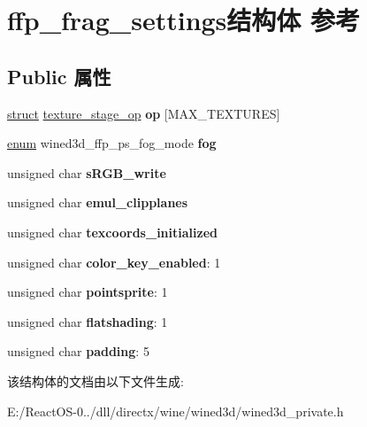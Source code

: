 \hypertarget{structffp__frag__settings}{}\section{ffp\+\_\+frag\+\_\+settings结构体 参考}
\label{structffp__frag__settings}
\subsection*{Public 属性}
\begin{DoxyCompactItemize}
\item 
\mbox{\label{structffp__frag__settings_a13650327188cc5ea8677666c7422610d}} 
\hyperlink{interfacestruct}{struct} \hyperlink{structtexture__stage__op}{texture\+\_\+stage\+\_\+op} {\bfseries op} \mbox{[}M\+A\+X\+\_\+\+T\+E\+X\+T\+U\+R\+ES\mbox{]}
\item 
\mbox{\label{structffp__frag__settings_a02babf3bd513580ca5a141f8d92f5da6}} 
\hyperlink{interfaceenum}{enum} wined3d\+\_\+ffp\+\_\+ps\+\_\+fog\+\_\+mode {\bfseries fog}
\item 
\mbox{\label{structffp__frag__settings_aff489fcd78f3488dd42478e176a00abd}} 
unsigned char {\bfseries s\+R\+G\+B\+\_\+write}
\item 
\mbox{\label{structffp__frag__settings_af1b196d48b9ed31fb173004661840627}} 
unsigned char {\bfseries emul\+\_\+clipplanes}
\item 
\mbox{\label{structffp__frag__settings_abf07d3e4ff25dec4634e55f4c8c65a42}} 
unsigned char {\bfseries texcoords\+\_\+initialized}
\item 
\mbox{\label{structffp__frag__settings_a5b70eaebcbeb16d4d65acfb8fc4de9e7}} 
unsigned char {\bfseries color\+\_\+key\+\_\+enabled}\+: 1
\item 
\mbox{\label{structffp__frag__settings_ace49c4621153d6dcdeadc83c4e1eed44}} 
unsigned char {\bfseries pointsprite}\+: 1
\item 
\mbox{\label{structffp__frag__settings_ac2a10e1735b6d7050a51b4d3f2297bbc}} 
unsigned char {\bfseries flatshading}\+: 1
\item 
\mbox{\label{structffp__frag__settings_a467ccb00d8a2c556160206d7a3a90dc4}} 
unsigned char {\bfseries padding}\+: 5
\end{DoxyCompactItemize}


该结构体的文档由以下文件生成\+:\begin{DoxyCompactItemize}
\item 
E\+:/\+React\+O\+S-\/0../dll/directx/wine/wined3d/wined3d\+\_\+private.\+h\end{DoxyCompactItemize}

